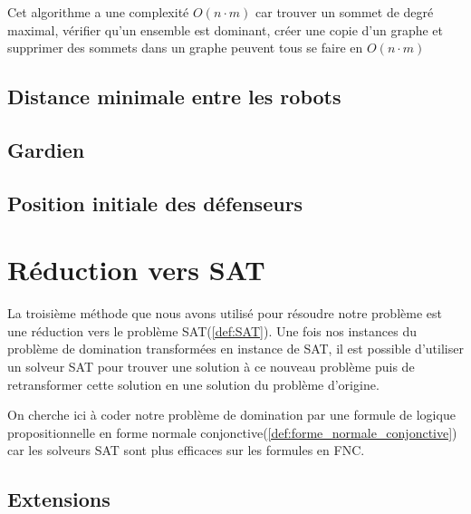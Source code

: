 \vspace{2\baselineskip}

Cet algorithme a une complexité $O(n\cdot m)$ car trouver un sommet de degré maximal, vérifier qu'un ensemble est dominant, créer une copie d'un graphe et supprimer des sommets dans un graphe peuvent tous se faire en $O(n\cdot m)$

\subsection{Distance minimale entre les robots}

\subsection{Gardien}

\subsection{Position initiale des défenseurs}

\section{Réduction vers SAT}

La troisième méthode que nous avons utilisé pour résoudre notre problème est une réduction vers le problème SAT(\ref{def:SAT}). Une fois nos instances du problème de domination transformées en instance de SAT, il est possible d'utiliser un solveur SAT pour trouver une solution à ce nouveau problème puis de retransformer cette solution en une solution du problème d'origine.\newline 

On cherche ici à coder notre problème de domination par une formule de logique propositionnelle en forme normale conjonctive(\ref{def:forme_normale_conjonctive}) car les solveurs SAT sont plus efficaces sur les formules en FNC.

\vspace{2\baselineskip}


\vspace{2\baselineskip}


\subsection{Extensions}